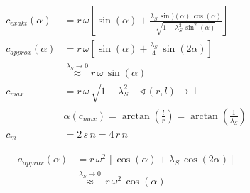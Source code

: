 \documentclass[english,threecolumn,color]{latex4ei/latex4ei_sheet}
\begin{document}
\begin{sectionbox}
	\begin{align*}
		c_{exakt}(\alpha)&=r\,\omega\left[ \sin(\alpha)+\frac{\lambda_S\,\sin)(\alpha)\,\cos(\alpha)}{\sqrt{1-\lambda_S^2 \, \sin^2(\alpha)}} \right]\\
		c_{approx}(\alpha)&=r\,\omega\left[ \sin(\alpha)+\frac{\lambda_S}{4}\,\sin(2\alpha) \right]\\
		&\overset{\lambda_S \to 0}{\approx} r\,\omega\,\sin(\alpha)\\
		c_{max}&=r\,\omega\,\sqrt{1+\lambda_S^2}\quad\sphericalangle(r,l)\rightarrow \bot\\
		&\alpha(c_{max})=\arctan\left(\frac{l}{r}\right)=\arctan\left( \frac{1}{\lambda_S} \right)\\
		c_m&=2\,s\,n=4\,r\,n
	\end{align*}
\end{sectionbox}
\begin{sectionbox}
	\begin{align*}
		a_{approx}(\alpha)&=r\,\omega^2\,\left[ \cos(\alpha)+\lambda_S\,\cos(2\alpha) \right]\\
		&\overset{\lambda_S \to 0}{\approx}\,r\,\omega^2\,\cos(\alpha)
	\end{align*}
\end{sectionbox}
\end{document}
